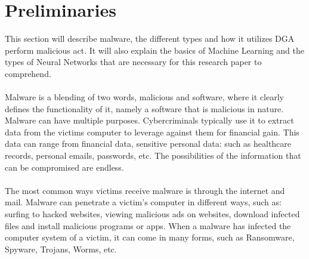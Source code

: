 \chapter{Preliminaries}\label{preliminaries}
This section will describe malware, the different types and how it utilizes DGA
perform malicious act. It will also explain the basics of Machine Learning and the types of Neural Networks that are necessary for this research paper to comprehend. \\\\ 
Malware is a blending of two words, malicious and
software, where it clearly defines the functionality of it, namely a software
that is malicious in nature. Malware can have multiple purposes. Cybercriminals
typically use it to extract data from the victims computer to leverage against
them for financial gain. This data can range from financial data, sensitive
personal data: such as healthcare records, personal emails, passwords, etc. The
possibilities of the information that can be compromised are endless.\\\\ The
most common ways victims receive malware is through the internet and mail.
Malware can penetrate a victim's computer in different ways, such as: surfing to
hacked websites, viewing malicious ads on websites, download infected files and
install malicious programs or apps. When a malware has infected the computer
system of a victim, it can come in many forms, such as Ransomware, Spyware,
Trojans, Worms, etc.
